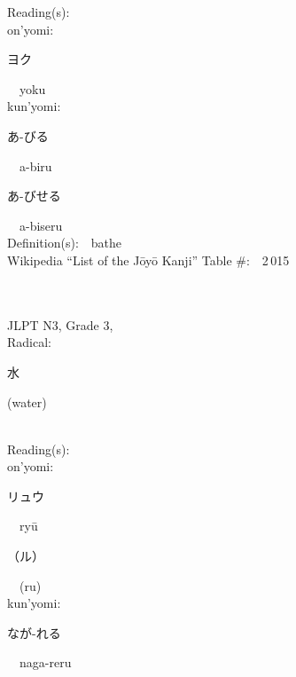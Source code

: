 \begin{multicols}{2}
Reading(s):\ \ \\
{\hspace*{1em}}on'yomi:\ \ \\
{\hspace*{2em}}{\begin{CJK}{UTF8}{min} ヨク \end{CJK}}\ \ yoku\ \ \\
{\hspace*{1em}}kun'yomi:\ \ \\
{\hspace*{2em}}{\begin{CJK}{UTF8}{min} あ-びる \end{CJK}}\ \ a-biru\ \ \\
{\hspace*{2em}}{\begin{CJK}{UTF8}{min} あ-びせる \end{CJK}}\ \ a-biseru\ \ \\
Definition(s):\ \ bathe \\
Wikipedia ``List of the J\=oy\=o Kanji'' Table \#:\ \ 2\,015 \\
\ \ \\
{\fontsize{34pt}{40pt}  }\ \ \\  %
{JLPT N3, Grade 3, \\Radical:\ \ {\begin{CJK}{UTF8}{min} 水 \end{CJK}} (water) } \\
Reading(s):\ \ \\
{\hspace*{1em}}on'yomi:\ \ \\
{\hspace*{2em}}{\begin{CJK}{UTF8}{min} リュウ \end{CJK}}\ \ ry\=u\ \ \\
{\hspace*{2em}}{\begin{CJK}{UTF8}{min} （ル） \end{CJK}}\ \ (ru)\ \ \\
{\hspace*{1em}}kun'yomi:\ \ \\
{\hspace*{2em}}{\begin{CJK}{UTF8}{min} なが-れる \end{CJK}}\ \ naga-reru\ \ \\

\end{multicols}
